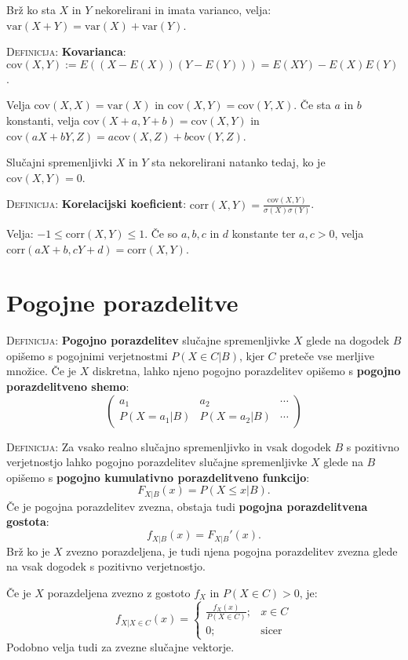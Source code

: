 \documentclass[8pt,a4paper]{amsart}
\theoremstyle{definition} %
\theoremstyle{plain} %
\begin{document}
Brž ko sta $X$ in $Y$ nekorelirani in imata varianco, velja: $\text{var}(X+Y) = \text{var}(X)+\text{var}(Y)$.

\textsc{Definicija:} \textbf{Kovarianca}: $\text{cov}(X,Y):=E((X-E(X))(Y-E(Y)))=E(XY)-E(X)E(Y)$. 

Velja $\text{cov}(X,X) = \text{var}(X)$ in $\text{cov}(X,Y) = \text{cov}(Y,X)$. Če sta $a$ in $b$ konstanti, velja $\text{cov}(X+a,Y+b)=\text{cov}(X,Y)$ in $\text{cov}(aX+bY,Z) = a\text{cov}(X,Z) + b\text{cov}(Y,Z)$. 

Slučajni spremenljivki $X$ in $Y$ sta nekorelirani natanko tedaj, ko je $\text{cov}(X,Y)=0$. 

\textsc{Definicija:} \textbf{Korelacijski koeficient}: $\text{corr}(X,Y)=\frac{\text{cov}(X,Y)}{\sigma (X) \sigma (Y)}$.

Velja: $-1 \leq \text{corr}(X,Y)\leq 1$. Če so $a,b,c$ in $d$ konstante ter $a,c > 0$, velja $\text{corr} (aX+b,cY+d) = \text{corr}(X,Y)$.

\section*{Pogojne porazdelitve}

\textsc{Definicija:} \textbf{Pogojno porazdelitev} slučajne spremenljivke $X$ glede na dogodek $B$ opišemo s pogojnimi verjetnostmi $P(X\in C | B)$, kjer $C$ preteče vse merljive množice. Če je $X$ diskretna, lahko njeno pogojno porazdelitev opišemo s \textbf{pogojno porazdelitveno shemo}:
$$
\begin{pmatrix}
a_1 & a_2 & \cdots \\
P(X=a_1 | B) & P(X=a_2 | B) & \cdots
\end{pmatrix}
$$

\textsc{Definicija:} Za vsako realno slučajno spremenljivko in vsak dogodek $B$ s pozitivno verjetnostjo lahko pogojno porazdelitev slučajne spremenljivke $X$ glede na $B$ opišemo s \textbf{pogojno kumulativno porazdelitveno funkcijo}:
$$
F_{X|B}(x) = P(X \leq x | B).
$$
Če je pogojna porazdelitev zvezna, obstaja tudi \textbf{pogojna porazdelitvena gostota}:
$$
f_{X|B}(x) = F_{X|B}'(x).
$$
Brž ko je $X$ zvezno porazdeljena, je tudi njena pogojna porazdelitev zvezna glede na vsak dogodek s pozitivno verjetnostjo.

Če je $X$ porazdeljena zvezno z gostoto $f_X$ in $P(X \in C) > 0$, je:
$$
f_{X|X\in C}(x) = \begin{cases} \frac{f_X(x)}{P(X \in C)}; & x\in C \\ 
0; & \mbox{sicer} \end{cases}
$$
Podobno velja tudi za zvezne slučajne vektorje.
\end{document}
